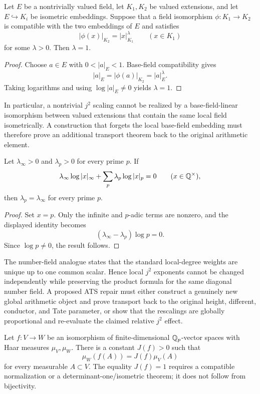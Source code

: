 \begin{lemma}\label{lem:base-field-rigidity}
Let $E$ be a nontrivially valued field, let $K_1,K_2$ be valued extensions,
and let $E\hookrightarrow K_i$ be isometric embeddings.  Suppose that a field
isomorphism $\phi:K_1\to K_2$ is compatible with the two embeddings of $E$ and
satisfies
\[
 |\phi(x)|_{K_2}=|x|_{K_1}^{\lambda}
 \qquad(x\in K_1)
\]
for some $\lambda>0$.  Then $\lambda=1$.
\end{lemma}

\begin{proof}
Choose $a\in E$ with $0<|a|_E<1$.  Base-field compatibility gives
\[
 |a|_E=|\phi(a)|_{K_2}=|a|_E^{\lambda}.
\]
Taking logarithms and using $\log|a|_E\ne0$ yields $\lambda=1$.
\end{proof}

In particular, a nontrivial $j^2$ scaling cannot be realized by a
base-field-linear isomorphism between valued extensions that contain the same
local field isometrically.  A construction that forgets the local base-field
embedding must therefore prove an additional transport theorem back to the
original arithmetic element.

\begin{lemma}\label{lem:product-rigidity}
Let $\lambda_\infty>0$ and $\lambda_p>0$ for every prime $p$.  If
\[
 \lambda_\infty\log|x|_\infty+
 \sum_p\lambda_p\log|x|_p=0
 \qquad(x\in\mathbb Q^\times),
\]
then $\lambda_p=\lambda_\infty$ for every prime $p$.
\end{lemma}

\begin{proof}
Set $x=p$.  Only the infinite and $p$-adic terms are nonzero, and the displayed
identity becomes
\[
 (\lambda_\infty-\lambda_p)\log p=0.
\]
Since $\log p\ne0$, the result follows.
\end{proof}

The number-field analogue states that the standard local-degree weights are
unique up to one common scalar.  Hence local $j^2$ exponents cannot be changed
independently while preserving the product formula for the same diagonal
number field.  A proposed ATS repair must either construct a genuinely new
global arithmetic object and prove transport back to the original height,
different, conductor, and Tate parameter, or show that the rescalings are
globally proportional and re-evaluate the claimed relative $j^2$ effect.

\begin{proposition}\label{prop:haar-jacobian}
Let $f:V\to W$ be an isomorphism of finite-dimensional $\mathbb Q_p$-vector spaces
with Haar measures $\mu_V,\mu_W$.  There is a constant $J(f)>0$ such that
\[
 \mu_W(f(A))=J(f)\mu_V(A)
\]
for every measurable $A\subset V$.  The equality $J(f)=1$ requires a compatible
normalization or a determinant-one/isometric theorem; it does not follow from
bijectivity.
\end{proposition}

